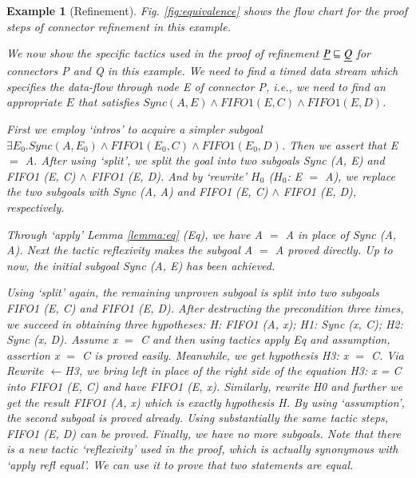 \documentclass[3p,times]{elsarticle}
\newtheorem{example}{Example}[section]
\begin{document}
\begin{example}[Refinement]
Fig. \ref{fig:equivalence} shows the flow chart for the proof steps of
connector refinement in this example.


We now show the specific tactics used in the proof of refinement
$\emph{P} \sqsubseteq \emph{Q}$ for connectors \emph{P} and \emph{Q}
in this example.
We need to find a timed data stream which specifies the data-flow through node \emph{E} of connector \emph{P}, i.e., we need to find an appropriate \emph{$E$} that satisfies $Sync(A,E)\wedge FIFO1(E,C) \wedge FIFO1(E,D)$.

First we employ `intros' to acquire a simpler subgoal $\exists E_{0}. Sync(A,E_{0})
\wedge FIFO1(E_{0},C) \wedge FIFO1(E_{0},D)$. Then we assert that \emph{E} $=$ \emph{A}.%
After using `split', we split the goal into two subgoals \emph{Sync (A, E)} and \emph{FIFO1 (E, C) $\wedge$ FIFO1 (E, D)}. And by `rewrite' \emph{$H_{0}$ ($H_{0}$: E $=$ A)}, we replace the two subgoals with \emph{Sync (A, A)} and \emph{FIFO1 (E, C) $\wedge$ FIFO1 (E, D)}, respectively.

Through `apply' Lemma \ref{lemma:eq} (\emph{Eq}), we have \emph{A $=$ A} in place of \emph{Sync (A, A)}. Next the tactic \emph{reflexivity} makes the subgoal \emph{A $=$ A} proved directly. Up to now, the initial subgoal \emph{Sync (A, E)} has been achieved.

Using `split' again, the remaining unproven subgoal is split into two subgoals \emph{FIFO1 (E, C)} and \emph {FIFO1 (E, D)}.
After destructing the precondition three times, we succeed in obtaining three hypotheses: \emph{ H: FIFO1 (A, x); H1: Sync (x, C); H2: Sync (x, D)}. Assume x $=$ C and then using tactics \emph{apply Eq} and \emph{assumption}, \emph{assertion x $=$ C} is proved easily. Meanwhile, we get hypothesis \emph{H3: x $=$ C}. Via \emph{Rewrite $\leftarrow$H3}, we bring left in place of the right side of the equation \emph{H3: x = C} into \emph{FIFO1 (E, C)} and have \emph{FIFO1 (E, x)}. Similarly, rewrite \emph{H0} and further we get the result \emph{FIFO1 (A, x)} which is exactly hypothesis \emph{H}. By using `assumption', the second subgoal is proved already.
Using substantially the same tactic steps, \emph{FIFO1 (E, D)} can be proved. Finally, we have no more subgoals. Note that there is a new tactic `reflexivity' used in the proof, which is actually synonymous with `apply refl equal'. We can use it to prove that two statements are equal.

\end{example}
\end{document}
